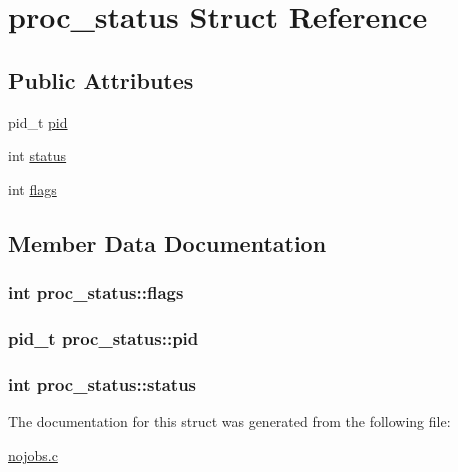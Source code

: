 \hypertarget{structproc__status}{}\section{proc\+\_\+status Struct Reference}
\label{structproc__status}
\subsection*{Public Attributes}
\begin{DoxyCompactItemize}
\item 
pid\+\_\+t \hyperlink{structproc__status_ad94b4a7c73f39bfdf869c300340fb34f}{pid}
\item 
int \hyperlink{structproc__status_aae75801d53e9f1c8667db35cc3cacf11}{status}
\item 
int \hyperlink{structproc__status_a89eac98aa12ef30d327bd03a81635a03}{flags}
\end{DoxyCompactItemize}


\subsection{Member Data Documentation}
\subsubsection[{\texorpdfstring{flags}{flags}}]{\setlength{\rightskip}{0pt plus 5cm}int proc\+\_\+status\+::flags}\hypertarget{structproc__status_a89eac98aa12ef30d327bd03a81635a03}{}\label{structproc__status_a89eac98aa12ef30d327bd03a81635a03}
\subsubsection[{\texorpdfstring{pid}{pid}}]{\setlength{\rightskip}{0pt plus 5cm}pid\+\_\+t proc\+\_\+status\+::pid}\hypertarget{structproc__status_ad94b4a7c73f39bfdf869c300340fb34f}{}\label{structproc__status_ad94b4a7c73f39bfdf869c300340fb34f}
\subsubsection[{\texorpdfstring{status}{status}}]{\setlength{\rightskip}{0pt plus 5cm}int proc\+\_\+status\+::status}\hypertarget{structproc__status_aae75801d53e9f1c8667db35cc3cacf11}{}\label{structproc__status_aae75801d53e9f1c8667db35cc3cacf11}


The documentation for this struct was generated from the following file\+:\begin{DoxyCompactItemize}
\item 
\hyperlink{nojobs_8c}{nojobs.\+c}\end{DoxyCompactItemize}
